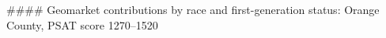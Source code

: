 #### Geomarket contributions by race and first-generation status: Orange County, PSAT score 1270–1520
